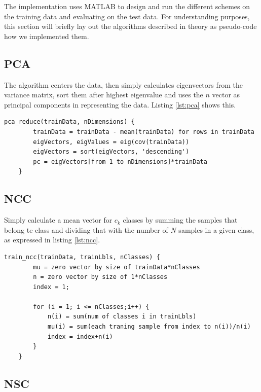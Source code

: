 \documentclass[journal]{IEEEtran}
\begin{document}
The implementation uses MATLAB to design and run the different schemes on the training data and evaluating on the test data. For understanding purposes, this section will briefly lay out the algorithms described in theory as pseudo-code how we implemented them.

\subsection{PCA} 

The algorithm centers the data, then simply calculates eigenvectors from the variance matrix, sort them after highest eigenvalue and uses the $n$ vector as principal components in representing the data. Listing \ref{lst:pca} shows this.

\begin{minipage}[t]{0.95\linewidth}
	\begin{lstlisting}[caption=Implementation of PCA., label={lst:pca}]
	pca_reduce(trainData, nDimensions) {
		trainData = trainData - mean(trainData) for rows in trainData
		eigVectors, eigValues = eig(cov(trainData))
		eigVectors = sort(eigVectors, 'descending')
		pc = eigVectors[from 1 to nDimensions]*trainData
	}
	\end{lstlisting}
\end{minipage}

\subsection{NCC} 

Simply calculate a mean vector for $c_{k}$ classes by summing the samples that belong te class and dividing that with the number of $N$ samples in a given class, as expressed in listing \ref{lst:ncc}.

\begin{minipage}[H]{0.95\linewidth}
	\begin{lstlisting}[caption=Implementation of NCC., label={lst:ncc}]
	train_ncc(trainData, trainLbls, nClasses) {
		mu = zero vector by size of trainData*nClasses
		n = zero vector by size of 1*nClasses
		index = 1;
		
		for (i = 1; i <= nClasses;i++) {
			n(i) = sum(num of classes i in trainLbls)
			mu(i) = sum(each traning sample from index to n(i))/n(i)		
			index = index+n(i)
		}
	}
	\end{lstlisting}
\end{minipage}

\subsection{NSC} 
\end{document}
